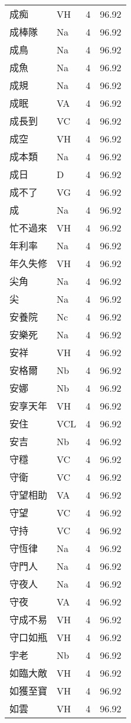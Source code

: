 \documentclass[twocolumn]{book}
\begin{document}
\begin{supertabular}{llrr}
成痴 & VH & 4 &  96.92\\
成棒隊 & Na & 4 &  96.92\\
成鳥 & Na & 4 &  96.92\\
成魚 & Na & 4 &  96.92\\
成規 & Na & 4 &  96.92\\
成眠 & VA & 4 &  96.92\\
成長到 & VC & 4 &  96.92\\
成空 & VH & 4 &  96.92\\
成本類 & Na & 4 &  96.92\\
成日 & D & 4 &  96.92\\
成不了 & VG & 4 &  96.92\\
成 & Na & 4 &  96.92\\
忙不過來 & VH & 4 &  96.92\\
年利率 & Na & 4 &  96.92\\
年久失修 & VH & 4 &  96.92\\
尖角 & Na & 4 &  96.92\\
尖 & Na & 4 &  96.92\\
安養院 & Nc & 4 &  96.92\\
安樂死 & Na & 4 &  96.92\\
安祥 & VH & 4 &  96.92\\
安格爾 & Nb & 4 &  96.92\\
安娜 & Nb & 4 &  96.92\\
安享天年 & VH & 4 &  96.92\\
安住 & VCL & 4 &  96.92\\
安吉 & Nb & 4 &  96.92\\
守穩 & VC & 4 &  96.92\\
守衛 & VC & 4 &  96.92\\
守望相助 & VA & 4 &  96.92\\
守望 & VC & 4 &  96.92\\
守持 & VC & 4 &  96.92\\
守恆律 & Na & 4 &  96.92\\
守門人 & Na & 4 &  96.92\\
守夜人 & Na & 4 &  96.92\\
守夜 & VA & 4 &  96.92\\
守成不易 & VH & 4 &  96.92\\
守口如瓶 & VH & 4 &  96.92\\
宇老 & Nb & 4 &  96.92\\
如臨大敵 & VH & 4 &  96.92\\
如獲至寶 & VH & 4 &  96.92\\
如雲 & VH & 4 &  96.92\\

\end{supertabular}
\end{document}
